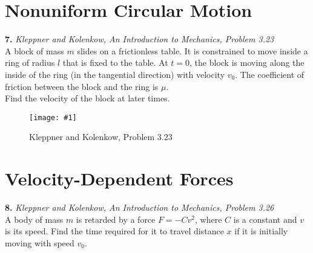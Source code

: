 \documentclass[11pt]{article}
\newcommand{\fig}[4]{
    \begin{figure}[H]
        \centering
        \texttt{[image: \#1]}
        \caption{#2}
        \label{exp4fit}
    \end{figure}
}
\theoremstyle{gangnamstyle}{\newtheorem{definition}{Definition}[]}
\theoremstyle{gangnamstyle}{\newtheorem{example}{Example}[]}
\theoremstyle{gangnamstyle}{\newtheorem{problem}{Problem}[]}
\begin{document}
\pagebreak

\section{Nonuniform Circular Motion}

\textbf{7.} \textit{Kleppner and Kolenkow, An Introduction to Mechanics, Problem 3.23} \\
A block of mass $m$ slides on a frictionless table. It is constrained
to move inside a ring of radius $l$ that is fixed to the table. At $t = 0$, the block is moving along the inside of the ring (in the tangential
direction) with velocity $v_0$. The coefficient of friction between the
block and the ring is $\mu$. \\
Find the velocity of the block at later times. \\
\fig{figs/0702/kk323.png}{Kleppner and Kolenkow, Problem 3.23}{0.65}{0}

\pagebreak

\section{Velocity-Dependent Forces}

\textbf{8.} \textit{Kleppner and Kolenkow, An Introduction to Mechanics, Problem 3.26} \\
A body of mass $m$ is retarded by a force $F = -Cv^2$, where $C$ is a constant and $v$ is its speed. Find the time required for it to travel distance $x$ if it is initially moving with speed $v_0$.




\end{document}
